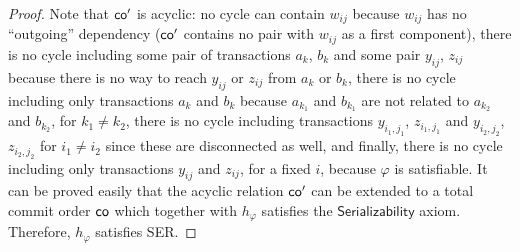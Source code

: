 \begin{proof}
Note that $\textsf{co}'$ is acyclic: no cycle can contain $w_{ij}$ because $w_{ij}$ has no ``outgoing'' dependency (\ie $\textsf{co}'$ contains no pair with $w_{ij}$ as a first component), there is no cycle including some pair of transactions $a_k$, $b_k$ and some pair $y_{ij}$, $z_{ij}$ because there is no way to reach $y_{ij}$ or $z_{ij}$ from $a_k$ or  $b_k$, there is no cycle including only transactions $a_k$ and $b_k$ because $a_{k_1}$ and $b_{k_1}$ are not related to $a_{k_2}$ and $b_{k_2}$, for $k_1\neq k_2$, there is no cycle including transactions $y_{i_1,j_1}$, $z_{i_1,j_1}$ and $y_{i_2,j_2}$, $z_{i_2,j_2}$ for $i_1\neq i_2$ since these are disconnected as well, and finally, there is no cycle including only transactions $y_{ij}$ and $z_{ij}$, for a fixed $i$, because $\varphi$ is satisfiable. It can be proved easily that the acyclic relation $\mathsf{co}'$ can be extended to a total commit order $\mathsf{co}$ which together with $h_\varphi$ satisfies the $\mathsf{Serializability}$ axiom. Therefore, $h_\varphi$ satisfies SER.
%
%
%
%
\end{proof}